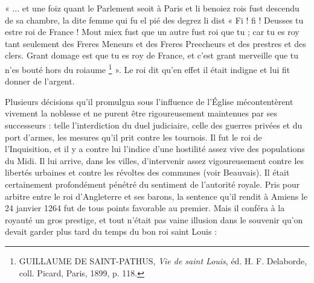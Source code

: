 \documentclass[french,twoside]{book} %
\newenvironment{quoteblock}%
  {\begin{quoting}}
  {\end{quoting}}
\newenvironment{quotebar}{%
    \def\FrameCommand{{\color{rubric!10!}\vrule width 0.5em} \hspace{0.9em}}%
    \def\OuterFrameSep{\itemsep} %
    \MakeFramed {\advance\hsize-\width \FrameRestore}
  }%
  {%
    \endMakeFramed
  }
\renewenvironment{quoteblock}%
  {%
    \savenotes
    \setstretch{0.9}
    \begin{quotebar}
  }
  {%
    \end{quotebar}
    \spewnotes
  }
\begin{document}
\begin{quoteblock}
\noindent « ... et une foiz quant le Parlement seoit à Paris et li benoiez rois fust descendu de sa chambre, la dite femme qui fu el pié des degrez li dist « Fi ! fi ! Deusses tu estre roi de France ! Mout miex fust que un autre fust roi que tu ; car tu es roy tant seulement des Freres Meneurs et des Freres Preecheurs et des prestres et des clers. Grant domage est que tu es roy de France, et c’est grant merveille que tu n’es bouté hors du roiaume \footnote{ GUILLAUME DE SAINT-PATHUS, {\itshape Vie de saint Louis}, éd. H. F. Delaborde, coll. Picard, Paris, 1899, p. 118.} ». Le roi dit qu’en effet il était indigne et lui fit donner de l’argent.\end{quoteblock}

\noindent Plusieurs décisions qu’il promulgua sous l’influence de l’Église mécontentèrent vivement la noblesse et ne purent être rigoureusement maintenues par ses successeurs : telle l’interdiction du duel judiciaire, celle des guerres privées et du port d’armes, les mesures qu’il prit contre les tournois. Il fut le roi de l’Inquisition, et il y a contre lui l’indice d’une hostilité assez vive des populations du Midi. Il lui arrive, dans les villes, d’intervenir assez vigoureusement contre les libertés urbaines et contre les révoltes des communes (voir Beauvais). Il était certainement profondément pénétré du sentiment de l’autorité royale. Pris pour arbitre entre le roi d’Angleterre et ses barons, la sentence qu’il rendit à Amiens le 24 janvier 1264 fut de tous points favorable au premier. Mais il conféra à la royauté un gros prestige, et tout n’était pas vaine illusion dans le souvenir qu’on devait garder plus tard du temps du bon roi saint Louis :\par
\end{document}
